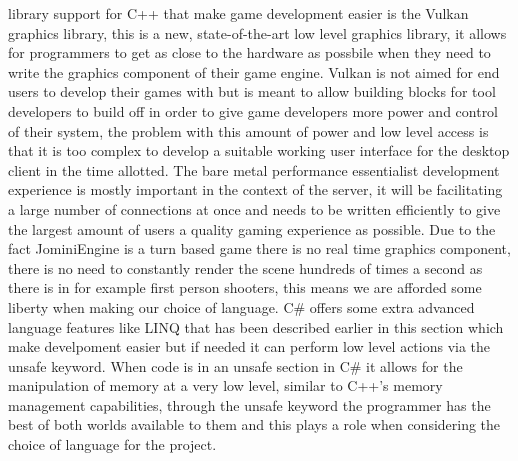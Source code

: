 \documentclass{article}
\begin{document}
library support for C++ that make game development easier is the Vulkan graphics library\cite{vulkan}, this is a new, state-of-the-art low level graphics library, it allows for programmers to get as close to the hardware as possbile when they need to write the graphics component of their game engine. Vulkan is not aimed for end users to develop their games with but is meant to allow building blocks for tool developers to build off in order to give game developers more power and control of their system, the problem with this amount of power and low level access is that it is too complex to develop a suitable working user interface for the desktop client in the time allotted. The bare metal performance essentialist development experience is mostly important in the context of the server, it will be facilitating a large number of connections at once and needs to be written efficiently to give the largest amount of users a quality gaming experience as possible. Due to the fact JominiEngine is a turn based game there is no real time graphics component, there is no need to constantly render the scene hundreds of times a second as there is in for example first person shooters, this means we are afforded some liberty when making our choice of language. C\# offers some extra advanced language features like LINQ that has been described earlier in this section which make develpoment easier but if needed it can perform low level actions via the unsafe keyword\cite{unsafe}. When code is in an unsafe section in C\# it allows for the manipulation of memory at a very low level, similar to C++'s memory management capabilities, through the unsafe keyword the programmer has the best of both worlds available to them and this plays a role when considering the choice of language for the project.
\end{document}
